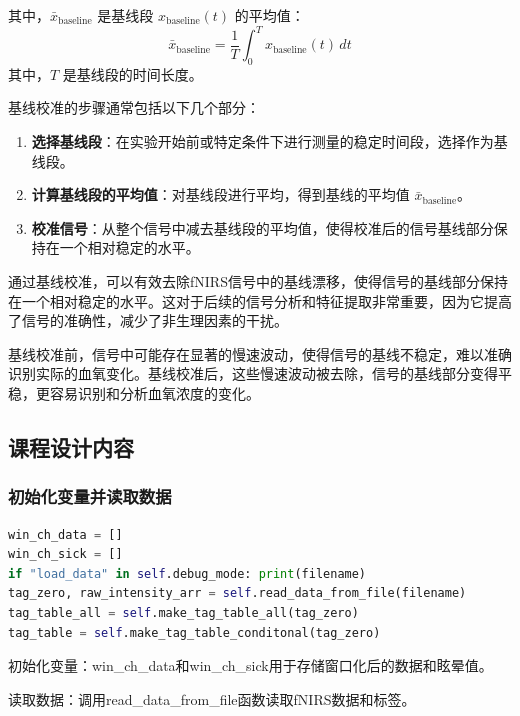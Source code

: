 \documentclass[a4paper,12pt]{article}
\begin{document}
其中，\( \bar{x}_{\text{baseline}} \) 是基线段 \( x_{\text{baseline}}(t) \) 的平均值：
\begin{equation}
\bar{x}_{\text{baseline}} = \frac{1}{T} \int_{0}^{T} x_{\text{baseline}}(t) \, dt
\end{equation}
其中，\( T \) 是基线段的时间长度。

基线校准的步骤通常包括以下几个部分：
\begin{enumerate}
    \item \textbf{选择基线段}：在实验开始前或特定条件下进行测量的稳定时间段，选择作为基线段。
    \item \textbf{计算基线段的平均值}：对基线段进行平均，得到基线的平均值 \( \bar{x}_{\text{baseline}} \)。
    \item \textbf{校准信号}：从整个信号中减去基线段的平均值，使得校准后的信号基线部分保持在一个相对稳定的水平。
\end{enumerate}

通过基线校准，可以有效去除fNIRS信号中的基线漂移，使得信号的基线部分保持在一个相对稳定的水平。这对于后续的信号分析和特征提取非常重要，因为它提高了信号的准确性，减少了非生理因素的干扰。

基线校准前，信号中可能存在显著的慢速波动，使得信号的基线不稳定，难以准确识别实际的血氧变化。基线校准后，这些慢速波动被去除，信号的基线部分变得平稳，更容易识别和分析血氧浓度的变化。

\subsection{课程设计内容}
\subsubsection{初始化变量并读取数据}
\begin{lstlisting}[language=python]
win_ch_data = []
win_ch_sick = []
if "load_data" in self.debug_mode: print(filename) 
tag_zero, raw_intensity_arr = self.read_data_from_file(filename)
tag_table_all = self.make_tag_table_all(tag_zero)
tag_table = self.make_tag_table_conditonal(tag_zero)

\end{lstlisting}
初始化变量：win\_ch\_data和win\_ch\_sick用于存储窗口化后的数据和眩晕值。

读取数据：调用read\_data\_from\_file函数读取fNIRS数据和标签。
\end{document}
